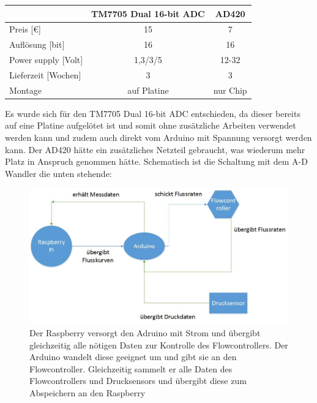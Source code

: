 \begin{center}
\begin{tabular}{l|c|c}
	& TM7705 Dual 16-bit ADC & AD420 \\ 
	\hline Preis [\euro]	& 15  & 7 \\ 
	\hline Auflösung [bit]	& 16  & 16 \\ 
	\hline Power supply [Volt]	& 1,3/3/5  & 12-32 \\ 
	\hline Lieferzeit [Wochen]	& 3  & 3 \\ 
	\hline Montage 	& auf Platine  & nur Chip \\ 
\end{tabular} 	
\end{center}


Es wurde sich für den TM7705 Dual 16-bit ADC entschieden, da dieser bereits auf eine Platine aufgelötet ist und somit ohne zusätzliche Arbeiten verwendet werden kann und zudem auch direkt vom Arduino mit Spannung versorgt werden kann. Der AD420 hätte ein zusätzliches Netzteil gebraucht, was wiederum mehr Platz in Anspruch genommen hätte. Schematisch ist die Schaltung mit dem A-D Wandler die unten stehende:


\begin{figure}[h]
	\begin{center}
		\includegraphics[scale=0.6]{Schema_Elektronik.jpg}
		\caption[Schema Elektronik]{Der Raspberry versorgt den Adruino mit Strom und übergibt gleichzeitig alle nötigen Daten zur Kontrolle des Flowcontrollers. Der Arduino wandelt diese geeignet um und gibt sie an den Flowcontroller. Gleichzeitig sammelt er alle Daten des Flowcontrollers und Drucksensors und übergibt diese zum Abspeichern an den Raspberry}
	\end{center}
\end{figure}


